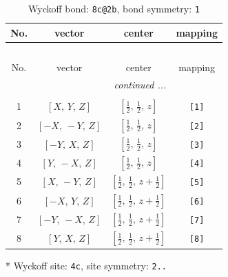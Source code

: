 \documentclass[fleqn,8pt]{jsarticle}
\begin{document}
\begin{longtable}{cccc}
\caption{Wyckoff bond: {\tt 8c@2b}, bond symmetry: {\tt 1}}
 \\
 \hline \hline
No. & vector & center & mapping \\ \hline \endfirsthead

\multicolumn{3}{l}{\tablename\ \thetable{}} \\
 \hline \hline
No. & vector & center & mapping \\ \hline \endhead

 \hline \hline
\multicolumn{3}{r}{\footnotesize\it continued ...} \\ \endfoot

 \hline \hline
\multicolumn{3}{r}{} \\ \endlastfoot

1 & $\left[ X,\, Y,\, Z \right]$ & $\left[ \frac{1}{2},\, \frac{1}{2},\, z \right]$ & {\tt [1]} \\ \hline
2 & $\left[ - X,\, - Y,\, Z \right]$ & $\left[ \frac{1}{2},\, \frac{1}{2},\, z \right]$ & {\tt [2]} \\ \hline
3 & $\left[ - Y,\, X,\, Z \right]$ & $\left[ \frac{1}{2},\, \frac{1}{2},\, z \right]$ & {\tt [3]} \\ \hline
4 & $\left[ Y,\, - X,\, Z \right]$ & $\left[ \frac{1}{2},\, \frac{1}{2},\, z \right]$ & {\tt [4]} \\ \hline
5 & $\left[ X,\, - Y,\, Z \right]$ & $\left[ \frac{1}{2},\, \frac{1}{2},\, z + \frac{1}{2} \right]$ & {\tt [5]} \\ \hline
6 & $\left[ - X,\, Y,\, Z \right]$ & $\left[ \frac{1}{2},\, \frac{1}{2},\, z + \frac{1}{2} \right]$ & {\tt [6]} \\ \hline
7 & $\left[ - Y,\, - X,\, Z \right]$ & $\left[ \frac{1}{2},\, \frac{1}{2},\, z + \frac{1}{2} \right]$ & {\tt [7]} \\ \hline
8 & $\left[ Y,\, X,\, Z \right]$ & $\left[ \frac{1}{2},\, \frac{1}{2},\, z + \frac{1}{2} \right]$ & {\tt [8]} \\
\end{longtable}
* Wyckoff site: {\tt 4c}, site symmetry: {\tt 2..}
\renewcommand{\arraystretch}{1.2}
\end{document}
